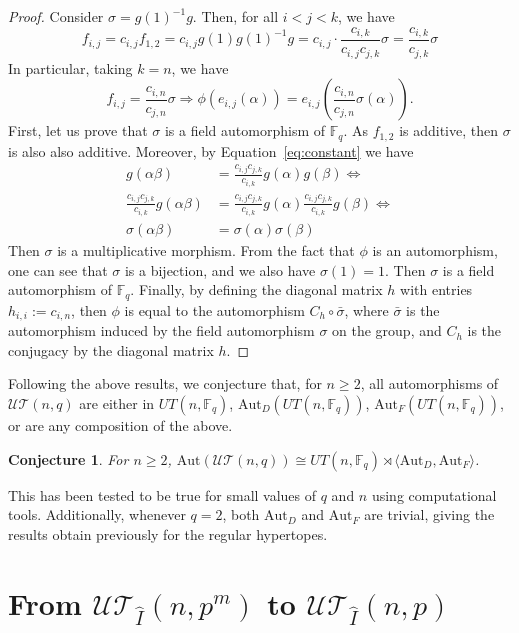 \documentclass[11pt,letterpaper]{amsart}
\newtheorem{conj}[theorem]{Conjecture}
\newcommand{\TT}{\mathcal{T}}
\newcommand{\Aut}{\mathrm{Aut}}
\newcommand{\FF}{\mathbb{F}}
\newcommand{\UU}{\mathcal{U}}
\begin{document}
\begin{proof}
Consider $\sigma = g(1)^{-1} g$. Then, for all $i<j<k$, we have
$$f_{i,j}=c_{i,j}f_{1,2}= c_{i,j} g(1) g(1)^{-1}g=c_{i,j}\cdot \frac{c_{i,k}}{c_{i,j}c_{j,k}}\sigma=\frac{c_{i,k}}{c_{j,k}}\sigma$$
In particular, taking $k=n$, we have 
$$f_{i,j} = \frac{c_{i,n}}{c_{j,n}}\sigma \Rightarrow \phi(e_{i,j}(\alpha)) = e_{i,j}\left(\frac{c_{i,n}}{c_{j,n}}\sigma(\alpha)\right).$$
First, let us prove that $\sigma$ is a field automorphism of $\FF_q$.
As $f_{1,2}$ is additive, then $\sigma$ is also also additive. Moreover, by Equation~\ref{eq:constant} we have
\begin{align*}
g(\alpha\beta)&= \frac{c_{i,j}c_{j,k}}{c_{i,k}}g(\alpha)g(\beta) \Leftrightarrow\\
    \frac{c_{i,j}c_{j,k}}{c_{i,k}}g(\alpha\beta)&= \frac{c_{i,j}c_{j,k}}{c_{i,k}}g(\alpha)\frac{c_{i,j}c_{j,k}}{c_{i,k}}g(\beta) \Leftrightarrow\\
\sigma(\alpha\beta) &= \sigma(\alpha)\sigma(\beta)
\end{align*}
Then $\sigma$ is a multiplicative morphism. From the fact that $\phi$ is an automorphism, one can see that $\sigma$ is a bijection, and we also have $\sigma(1)=1$. Then $\sigma$ is a field automorphism of $\FF_q$. 
Finally, by defining the diagonal matrix $h$ with entries $h_{i,i}:=c_{i,n}$, then $\phi$ is equal to the automorphism $C_h\circ\bar\sigma$, where $\bar\sigma$ is the automorphism induced by the field automorphism $\sigma$ on the group, and $C_h$ is the conjugacy by the diagonal matrix $h$.

\end{proof}


Following the above results, we conjecture that, for $n\geq 2$, all automorphisms of $\UU\TT(n,q)$ are either in $UT(n,\FF_q)$, $\Aut_D(UT(n,\FF_q))$, $\Aut_F(UT(n,\FF_q))$, or are any composition of the above.

\begin{conj} For $n\geq 2$,
    $\Aut(\UU\TT(n,q)) \cong UT(n,\FF_q)\rtimes \langle \Aut_D,\Aut_F\rangle$.
\end{conj}

This has been tested to be true for small values of $q$ and $n$ using computational tools.
Additionally, whenever $q=2$, both $\Aut_D$ and $\Aut_F$ are trivial, giving the results obtain previously for the regular hypertopes.


\section{From $\UU\TT_{\widehat{I}}(n,p^m)$ to $\UU\TT_{\widehat{I}}(n,p)$}
\end{document}
